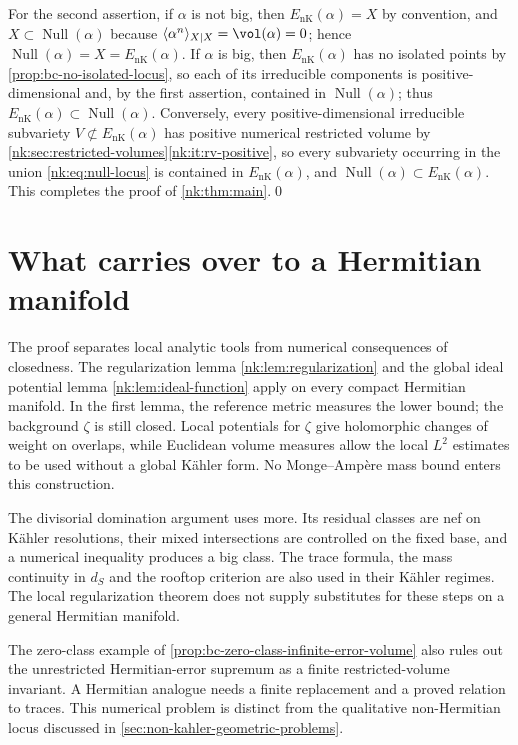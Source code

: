 For the second assertion, if $\alpha$ is not big, then
${E_{\mathrm{nK}}}(\alpha)=X$ by convention, and $X\subset\operatorname{Null}(\alpha)$ because
$\langle\alpha^n\rangle_{X\mid X}=\vol(\alpha)=0$; hence
$\operatorname{Null}(\alpha)=X={E_{\mathrm{nK}}}(\alpha)$. If $\alpha$ is big, then
${E_{\mathrm{nK}}}(\alpha)$ has no isolated points by \cref{prop:bc-no-isolated-locus}, so
each of its irreducible components is positive-dimensional and, by the
first assertion, contained in $\operatorname{Null}(\alpha)$; thus
${E_{\mathrm{nK}}}(\alpha)\subset\operatorname{Null}(\alpha)$. Conversely, every
positive-dimensional irreducible subvariety $V\not\subset{E_{\mathrm{nK}}}(\alpha)$
has positive numerical restricted volume by
\cref{nk:sec:restricted-volumes}\ref{nk:it:rv-positive}, so every subvariety
occurring in the union \eqref{nk:eq:null-locus} is contained in
${E_{\mathrm{nK}}}(\alpha)$, and $\operatorname{Null}(\alpha)\subset{E_{\mathrm{nK}}}(\alpha)$. This completes
the proof of \cref{nk:thm:main}.\qed


\section{What carries over to a Hermitian manifold}

The proof separates local analytic tools from numerical consequences of
closedness. The regularization lemma \ref{nk:lem:regularization} and the
global ideal potential lemma \ref{nk:lem:ideal-function} apply on every
compact Hermitian manifold. In the first lemma, the reference metric
measures the lower bound; the background $\zeta$ is still closed. Local
potentials for $\zeta$ give holomorphic changes of weight on overlaps,
while Euclidean volume measures allow the local $L^2$ estimates to be
used without a global K\"ahler form. No Monge--Amp\`ere mass bound enters
this construction.

The divisorial domination argument uses more. Its residual classes are
nef on K\"ahler resolutions, their mixed intersections are controlled on
the fixed base, and a numerical inequality produces a big class. The
trace formula, the mass continuity in $d_S$ and the rooftop criterion are
also used in their K\"ahler regimes. The local regularization theorem
does not supply substitutes for these steps on a general Hermitian
manifold.

The zero-class example of \cref{prop:bc-zero-class-infinite-error-volume}
also rules out the unrestricted Hermitian-error supremum as a finite
restricted-volume invariant. A Hermitian analogue needs a finite
replacement and a proved relation to traces. This numerical problem is
distinct from the qualitative non-Hermitian locus discussed in
\cref{sec:non-kahler-geometric-problems}.
